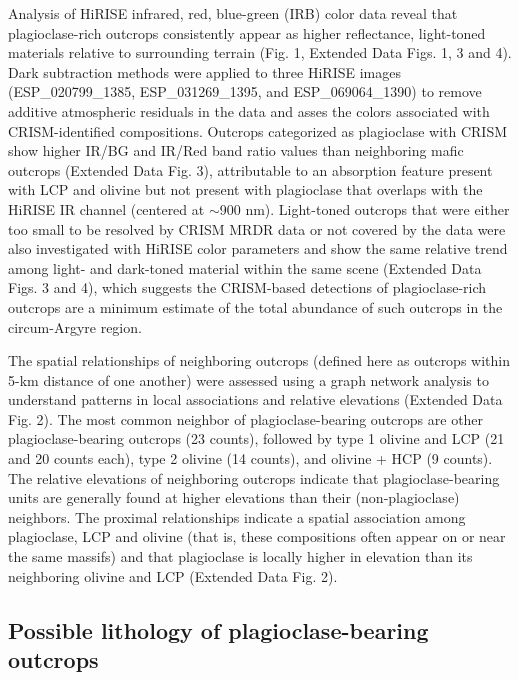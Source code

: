 \documentclass[11pt]{article}
\begin{document}
Analysis of HiRISE infrared, red, blue-green (IRB) color data reveal that plagioclase-rich outcrops consistently appear as higher reflectance, light-toned materials relative to surrounding terrain (Fig. 1, Extended Data Figs. 1, 3 and 4). Dark subtraction methods \citep{Tornabene2018} were applied to three HiRISE images (ESP\_020799\_1385, ESP\_031269\_1395, and ESP\_069064\_1390) to remove additive atmospheric residuals in the data and asses the colors associated with CRISM-identified compositions. Outcrops categorized as plagioclase with CRISM show higher IR/BG and IR/Red band ratio values than neighboring mafic outcrops (Extended Data Fig. 3), attributable to an absorption feature present with LCP and olivine but not present with plagioclase that overlaps with the HiRISE IR channel (centered at $\sim$900 nm). Light-toned outcrops that were either too small to be resolved by CRISM MRDR data or not covered by the data were also investigated with HiRISE color parameters and show the same relative trend among light- and dark-toned material within the same scene (Extended Data Figs. 3 and 4), which suggests the CRISM-based detections of plagioclase-rich outcrops are a minimum estimate of the total abundance of such outcrops in the circum-Argyre region.

The spatial relationships of neighboring outcrops (defined here as outcrops within 5-km distance of one another) were assessed using a graph network analysis to understand patterns in local associations and relative elevations (Extended Data Fig. 2). The most common neighbor of plagioclase-bearing outcrops are other plagioclase-bearing outcrops (23 counts), followed by type 1 olivine and LCP (21 and 20 counts each), type 2 olivine (14 counts), and olivine + HCP (9 counts). The relative elevations of neighboring outcrops indicate that plagioclase-bearing units are generally found at higher elevations than their (non-plagioclase) neighbors. The proximal relationships indicate a spatial association among plagioclase, LCP and olivine (that is, these compositions often appear on or near the same massifs) and that plagioclase is locally higher in elevation than its neighboring olivine and LCP (Extended Data Fig. 2).

\subsection*{Possible lithology of plagioclase-bearing outcrops}
\end{document}
